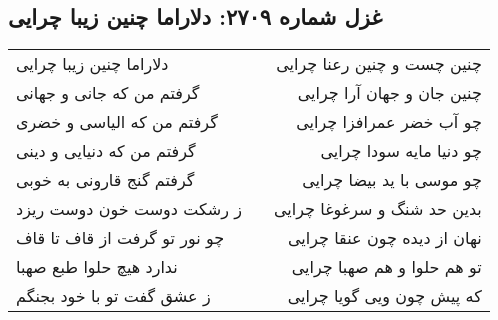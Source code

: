 \begin{center}
\section*{غزل شماره ۲۷۰۹: دلاراما چنین زیبا چرایی}
\label{sec:2709}
\begin{longtable}{l p{0.5cm} r}
دلاراما چنین زیبا چرایی
&&
چنین چست و چنین رعنا چرایی
\\
گرفتم من که جانی و جهانی
&&
چنین جان و جهان آرا چرایی
\\
گرفتم من که الیاسی و خضری
&&
چو آب خضر عمرافزا چرایی
\\
گرفتم من که دنیایی و دینی
&&
چو دنیا مایه سودا چرایی
\\
گرفتم گنج قارونی به خوبی
&&
چو موسی با ید بیضا چرایی
\\
ز رشکت دوست خون دوست ریزد
&&
بدین حد شنگ و سرغوغا چرایی
\\
چو نور تو گرفت از قاف تا قاف
&&
نهان از دیده چون عنقا چرایی
\\
ندارد هیچ حلوا طبع صهبا
&&
تو هم حلوا و هم صهبا چرایی
\\
ز عشق گفت تو با خود بجنگم
&&
که پیش چون ویی گویا چرایی
\\
\end{longtable}
\end{center}
